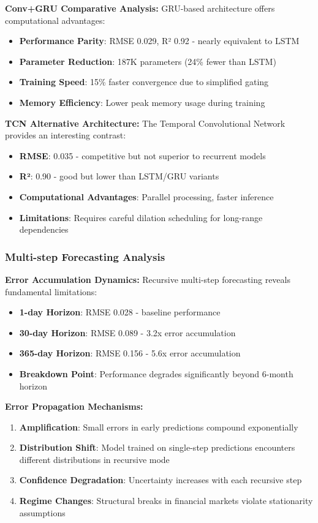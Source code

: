 \documentclass[conference]{IEEEtran}
\begin{document}
\textbf{Conv+GRU Comparative Analysis:}
GRU-based architecture offers computational advantages:
\begin{itemize}
  \item \textbf{Performance Parity}: RMSE 0.029, R² 0.92 - nearly equivalent to LSTM
  \item \textbf{Parameter Reduction}: 187K parameters (24\% fewer than LSTM)
  \item \textbf{Training Speed}: 15\% faster convergence due to simplified gating
  \item \textbf{Memory Efficiency}: Lower peak memory usage during training
\end{itemize}

\textbf{TCN Alternative Architecture:}
The Temporal Convolutional Network provides an interesting contrast:
\begin{itemize}
  \item \textbf{RMSE}: 0.035 - competitive but not superior to recurrent models
  \item \textbf{R²}: 0.90 - good but lower than LSTM/GRU variants
  \item \textbf{Computational Advantages}: Parallel processing, faster inference
  \item \textbf{Limitations}: Requires careful dilation scheduling for long-range dependencies
\end{itemize}

\subsubsection{Multi-step Forecasting Analysis}

\textbf{Error Accumulation Dynamics:}
Recursive multi-step forecasting reveals fundamental limitations:
\begin{itemize}
  \item \textbf{1-day Horizon}: RMSE 0.028 - baseline performance
  \item \textbf{30-day Horizon}: RMSE 0.089 - 3.2x error accumulation
  \item \textbf{365-day Horizon}: RMSE 0.156 - 5.6x error accumulation
  \item \textbf{Breakdown Point}: Performance degrades significantly beyond 6-month horizon
\end{itemize}

\textbf{Error Propagation Mechanisms:}
\begin{enumerate}
  \item \textbf{Amplification}: Small errors in early predictions compound exponentially
  \item \textbf{Distribution Shift}: Model trained on single-step predictions encounters different distributions in recursive mode
  \item \textbf{Confidence Degradation}: Uncertainty increases with each recursive step
  \item \textbf{Regime Changes}: Structural breaks in financial markets violate stationarity assumptions
\end{enumerate}
\end{document}
